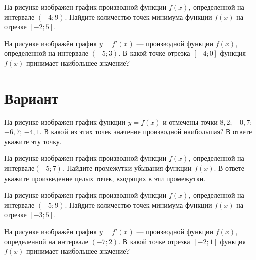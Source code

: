 \begin{taskBN}{3}
На рисунке изображен график производной функции $f(x)$, определенной на интервале $(-4;9)$. Найдите количество точек минимума функции $f(x)$ на отрезке $[-2;5]$. 
\end{taskBN}

\begin{taskBN}{4}
На рисунке изображён график $y=f'(x)$ — производной функции $f(x)$, определенной на интервале $(-5;3)$. В какой точке отрезка $[-4; 0]$ функция $f(x)$ принимает наибольшее значение?
\end{taskBN}

\newpage\section{Вариант}\begin{taskBN}{1}
На рисунке изображен график функции $y=f(x)$ и отмечены точки $8,2$; $-0,7$; $-6,7$; $-4,1$. В какой из этих точек значение производной наибольшая? В ответе укажите эту точку. 
\end{taskBN}

\begin{taskBN}{2}
На рисунке изображен график производной функции $f(x)$, определенной на интервале$(-5; 7)$. Найдите промежутки убывания функции $f(x)$. В ответе укажите произведение целых точек, входящих в эти промежутки.
\end{taskBN}

\begin{taskBN}{3}
На рисунке изображен график производной функции $f(x)$, определенной на интервале $(-5;9)$. Найдите количество точек минимума функции $f(x)$ на отрезке $[-3;5]$. 
\end{taskBN}

\begin{taskBN}{4}
На рисунке изображён график $y=f'(x)$ — производной функции $f(x)$, определенной на интервале $(-7;2)$. В какой точке отрезка $[-2; 1]$ функция $f(x)$ принимает наибольшее значение?
\end{taskBN}

